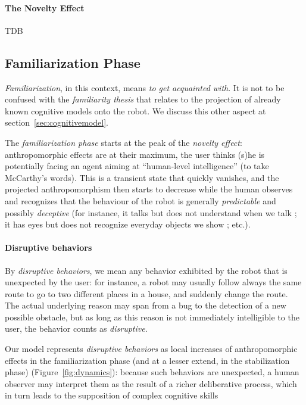 \documentclass{frontiersSCNS} %
\begin{document}
\paragraph{The Novelty Effect}
\label{sec:noveltyeffect}

TDB

\subsection{Familiarization Phase}
\label{sec:familiarization}

\emph{Familiarization}, in this context, means \emph{to get acquainted with}.
It is not to be confused with the \emph{familiarity thesis} that relates to the
projection of already known cognitive models onto the robot. We discuss this other
aspect at section~\ref{sec:cognitivemodel}.

The \emph{familiarization phase} starts at the peak of the \emph{novelty
effect}: anthropomorphic effects are at their maximum, the user thinks (s)he is
potentially facing an agent aiming at ``human-level intelligence'' (to take
McCarthy's words). This is a transient state that quickly vanishes, and the
projected anthropomorphism then starts to decrease while the human observes and
recognizes that the behaviour of the robot is generally \emph{predictable} and
possibly \emph{deceptive} (for instance, it talks but does not understand when
we talk ; it has eyes but does not recognize everyday objects we show ; etc.).

\paragraph{Disruptive behaviors}

By \emph{disruptive behaviors}, we mean any behavior exhibited by the robot
that is unexpected by the user: for instance, a robot may usually follow always
the same route to go to two different places in a house, and suddenly change
the route. The actual underlying reason may span from a bug to the detection of
a new possible obstacle, but as long as this reason is not immediately
intelligible to the user, the behavior counts as \emph{disruptive}.

Our model represents \emph{disruptive behaviors} as local increases of
anthropomorphic effects in the familiarization phase (and at a lesser extend,
in the stabilization phase) (Figure~\ref{fig:dynamics}): because such behaviors
are unexpected, a human observer may interpret them as the result of a richer
deliberative process, which in turn leads to the supposition of complex
cognitive skills
\end{document}
